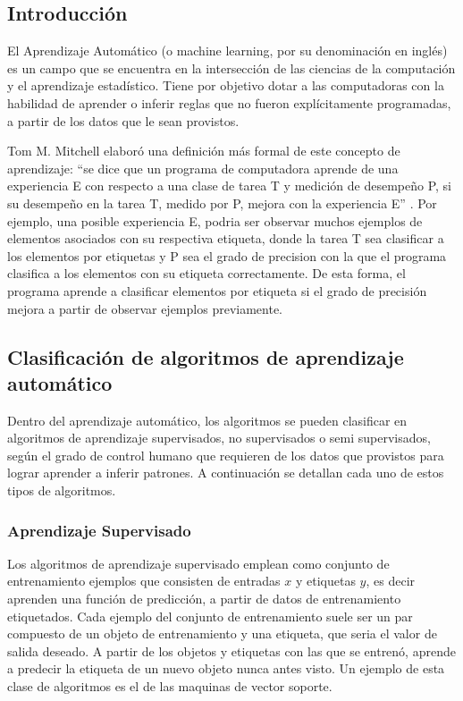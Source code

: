 \documentclass[a4paper,11pt,spanish]{book}
\begin{document}
    \subsection{Introducción}
      El Aprendizaje Automático (o machine learning, por su denominación en inglés) es un campo que se encuentra en la intersección de las ciencias de la computación
      y el aprendizaje estadístico. Tiene por objetivo dotar a las computadoras con la habilidad de aprender o inferir reglas que no fueron explícitamente programadas, a partir
      de los datos que le sean provistos.

      Tom M. Mitchell elaboró una definición más formal de este concepto de aprendizaje: “se dice que un programa de computadora aprende de una experiencia E con respecto a una clase
      de tarea T y medición de desempeño P, si su desempeño en la tarea T, medido por P, mejora con la experiencia E” \cite{Mitchell:1997:ML:541177}. Por ejemplo, una posible experiencia
      E, podria ser observar muchos ejemplos de elementos asociados con su respectiva etiqueta, donde la tarea T sea clasificar a los elementos por etiquetas y P sea el grado de precision
      con la que el programa clasifica a los elementos con su etiqueta correctamente. De esta forma, el programa aprende a clasificar elementos por etiqueta si el grado de precisión mejora
      a partir de observar ejemplos previamente.

    \subsection{Clasificación de algoritmos de aprendizaje automático}
      Dentro del aprendizaje automático, los algoritmos se pueden clasificar en algoritmos de aprendizaje supervisados, no supervisados o semi supervisados,
      según el grado de control humano que requieren de los datos que provistos para lograr aprender a inferir patrones. A continuación se detallan cada uno de estos tipos de algoritmos.

      \subsubsection{Aprendizaje Supervisado} \label{sec:supervisado}
	Los algoritmos de aprendizaje supervisado emplean como conjunto de entrenamiento ejemplos que consisten de entradas $x$ y etiquetas $y$, es decir
	aprenden una función de predicción, a partir de datos de entrenamiento etiquetados. Cada ejemplo del conjunto de entrenamiento suele ser un par
	compuesto de un objeto de entrenamiento y una etiqueta, que seria el valor de salida deseado.
	A partir de los objetos y etiquetas con las que se entrenó, aprende a predecir la etiqueta de un nuevo objeto nunca antes visto. Un ejemplo de esta clase de algoritmos es el de
	las maquinas de vector soporte.
\end{document}
